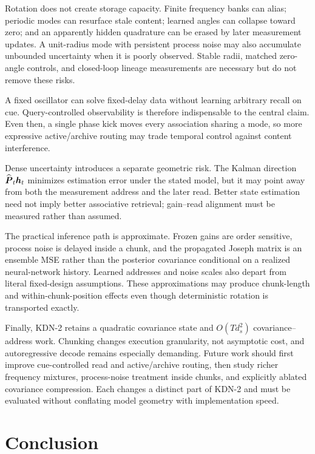 \documentclass[11pt,letterpaper,logo]{yalearxiv}
\begin{document}
Rotation does not create storage capacity. Finite frequency banks can alias; periodic modes can
resurface stale content; learned angles can collapse toward zero; and an apparently hidden
quadrature can be erased by later measurement updates. A unit-radius mode with persistent process
noise may also accumulate unbounded uncertainty when it is poorly observed. Stable radii, matched
zero-angle controls, and closed-loop lineage measurements are necessary but do not remove these
risks.

A fixed oscillator can solve fixed-delay data without learning arbitrary recall on cue.
Query-controlled observability is therefore indispensable to the central claim. Even then, a
single phase kick moves every association sharing a mode, so more expressive active/archive
routing may trade temporal control against content interference.

Dense uncertainty introduces a separate geometric risk. The Kalman direction
$\widehat{\boldsymbol{P}}_t\boldsymbol{h}_t$ minimizes estimation error under the stated model, but it may point
away from both the measurement address and the later read. Better state estimation need not imply
better associative retrieval; gain--read alignment must be measured rather than assumed.

The practical inference path is approximate. Frozen gains are order sensitive, process noise is
delayed inside a chunk, and the propagated Joseph matrix is an ensemble MSE rather than the
posterior covariance conditional on a realized neural-network history. Learned addresses and noise
scales also depart from literal fixed-design assumptions. These approximations may produce
chunk-length and within-chunk-position effects even though deterministic rotation is transported
exactly.

Finally, KDN-2 retains a quadratic covariance state and $O(Td_s^2)$ covariance--address work.
Chunking changes execution granularity, not asymptotic cost, and autoregressive decode remains
especially demanding. Future work should first improve cue-controlled read and active/archive
routing, then study richer frequency mixtures, process-noise treatment inside chunks, and
explicitly ablated covariance compression. Each changes a distinct part of KDN-2 and must be
evaluated without conflating model geometry with implementation speed.


\section{Conclusion}
\label{sec:kdn2-conclusion}
\end{document}
